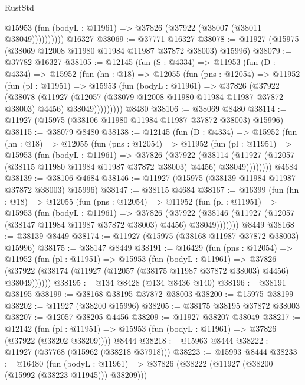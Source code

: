 \begin{lexlean}{RustStd}
\begin{coremodule}
              @15953 (fun (bodyL : @11961) => @37826 (@37922 (@38007 (@38011 @38049))))))))))
    @16327
@38069 := @37771 @16327
@38078 := @11927 (@15975 (@38069 @12008 @11980 @11984 @11987 @37872 @38003) @15996)
@38079 := @37782 @16327
@38105 := @12145
    (fun (S : @4334) =>
    @11953
      (fun (D : @4334) =>
      @15952
        (fun (hn : @18) =>
        @12055
          (fun (pns : @12054) =>
          @11952
            (fun (pl : @11951) =>
            @15953
              (fun (bodyL : @11961) =>
              @37826
                (@37922
                  (@38078
                    (@11927
                      (@12057 (@38079 @12008 @11980 @11984 @11987 @37872 @38003) @4456)
                      @38049)))))))))
    @8480
@38106 := @38069 @8480
@38114 := @11927 (@15975 (@38106 @11980 @11984 @11987 @37872 @38003) @15996)
@38115 := @38079 @8480
@38138 := @12145
    (fun (D : @4334) =>
    @15952
      (fun (hn : @18) =>
      @12055
        (fun (pns : @12054) =>
        @11952
          (fun (pl : @11951) =>
          @15953
            (fun (bodyL : @11961) =>
            @37826
              (@37922
                (@38114
                  (@11927 (@12057 (@38115 @11980 @11984 @11987 @37872 @38003) @4456) @38049))))))))
    @4684
@38139 := @38106 @4684
@38146 := @11927 (@15975 (@38139 @11984 @11987 @37872 @38003) @15996)
@38147 := @38115 @4684
@38167 := @16399
    (fun (hn : @18) =>
    @12055
      (fun (pns : @12054) =>
      @11952
        (fun (pl : @11951) =>
        @15953
          (fun (bodyL : @11961) =>
          @37826
            (@37922
              (@38146 (@11927 (@12057 (@38147 @11984 @11987 @37872 @38003) @4456) @38049)))))))
    @8449
@38168 := @38139 @8449
@38174 := @11927 (@15975 (@38168 @11987 @37872 @38003) @15996)
@38175 := @38147 @8449
@38191 := @16429
    (fun (pns : @12054) =>
    @11952
      (fun (pl : @11951) =>
      @15953
        (fun (bodyL : @11961) =>
        @37826 (@37922 (@38174 (@11927 (@12057 (@38175 @11987 @37872 @38003) @4456) @38049))))))
@38195 := @134 @8428 (@134 @8436 @140)
@38196 := @38191 @38195
@38199 := @38168 @38195 @37872 @38003
@38200 := @15975 @38199
@38202 := @11927 (@38200 @15996)
@38205 := @38175 @38195 @37872 @38003
@38207 := @12057 @38205 @4456
@38209 := @11927 @38207 @38049
@38217 := @12142
    (fun (pl : @11951) => @15953 (fun (bodyL : @11961) => @37826 (@37922 (@38202 @38209))))
    @8444
@38218 := @15963 @8444
@38222 := @11927 (@37768 (@15962 (@38218 @37918)))
@38223 := @15993 @8444
@38233 := @16480
    (fun (bodyL : @11961) => @37826 (@38222 (@11927 (@38200 (@15992 (@38223 @11945))) @38209)))

\end{coremodule}
\end{lexlean}
